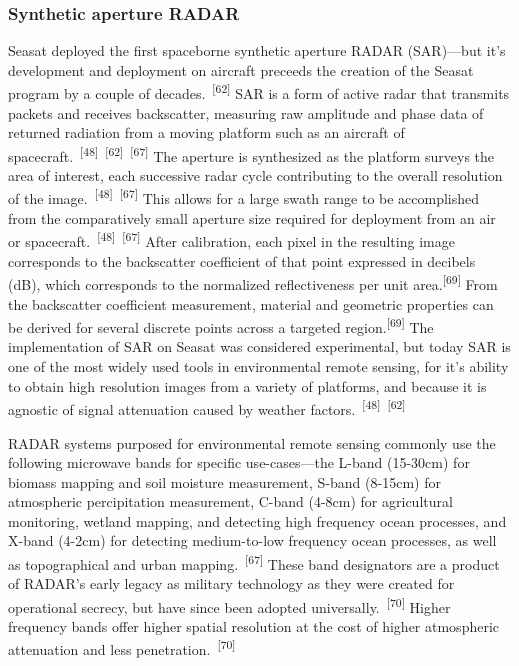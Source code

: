 \documentclass{article}
\begin{document}
\subsubsection{Synthetic aperture RADAR}


\par{Seasat deployed the first spaceborne synthetic aperture RADAR (SAR)---but it's development and deployment on aircraft preceeds the creation of the Seasat program by a couple of decades.~\textsuperscript{[62]} SAR is a form of active radar that transmits packets and receives backscatter, measuring raw amplitude and phase data of returned radiation from a moving platform such as an aircraft of spacecraft.~\textsuperscript{[48]}~\textsuperscript{[62]}~\textsuperscript{[67]} The aperture is synthesized as the platform surveys the area of interest, each successive radar cycle contributing to the overall resolution of the image.~\textsuperscript{[48]}~\textsuperscript{[67]} This allows for a large swath range to be accomplished from the comparatively small aperture size required for deployment from an air or spacecraft.~\textsuperscript{[48]}~\textsuperscript{[67]} After calibration, each pixel in the resulting image corresponds to the backscatter coefficient of that point expressed in decibels (dB), which corresponds to the normalized reflectiveness per unit area.\textsuperscript{[69]} From the backscatter coefficient measurement, material and geometric properties can be derived for several discrete points across a targeted region.\textsuperscript{[69]} The implementation of SAR on Seasat was considered experimental, but today SAR is one of the most widely used tools in environmental remote sensing, for it's ability to obtain high resolution images from a variety of platforms, and because it is agnostic of signal attenuation caused by weather factors.~\textsuperscript{[48]}~\textsuperscript{[62]}}


\par{RADAR systems purposed for environmental remote sensing commonly use the following microwave bands for specific use-cases---the L-band (15-30cm) for biomass mapping and soil moisture measurement, S-band (8-15cm) for atmospheric percipitation measurement, C-band (4-8cm) for agricultural monitoring, wetland mapping, and detecting high frequency ocean processes, and X-band (4-2cm) for detecting medium-to-low frequency ocean processes, as well as topographical and urban mapping.~\textsuperscript{[67]} These band designators are a product of RADAR's early legacy as military technology as they were created for operational secrecy, but have since been adopted universally.~\textsuperscript{[70]} Higher frequency bands offer higher spatial resolution at the cost of higher atmospheric attenuation and less penetration.~\textsuperscript{[70]}}
\end{document}
